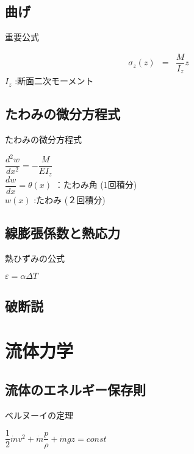 \documentclass[a4paper]{jsarticle}
\begin{document}
\subsection{曲げ}
\begin{itembox}[l]{重要公式}
    \begin{center}
        \begin{eqnarray*}
            \sigma_z\left(z\right)&=&\dfrac{M}{I_z}z
        \end{eqnarray*}
        $I_z$ :断面二次モーメント
    \end{center}
\end{itembox}
\subsection{たわみの微分方程式}
\begin{itembox}[l]{たわみの微分方程式}
    \begin{center}
        $\dfrac{d^2w}{dx^2}=-\dfrac{M}{EI_z}$\\
        $\dfrac{dw}{dx}=\theta\left(x\right)$ ：たわみ角 (1回積分)\\
        $w\left(x\right)$ :たわみ (２回積分)
    \end{center}
\end{itembox}
\subsection{線膨張係数と熱応力}
\begin{itembox}[l]{熱ひずみの公式}
    \begin{center}
        $\varepsilon=\alpha\Delta T$
    \end{center}
\end{itembox}
\subsection{破断説}
\section{流体力学}
\subsection{流体のエネルギー保存則}
\begin{itembox}[l]{ベルヌーイの定理}
    \begin{center}
        $\dfrac{1}{2}\dot{m}v^2+\dot{m}\dfrac{p}{\rho}+\dot{m}gz=const$
    \end{center}
\end{itembox}
\end{document}
